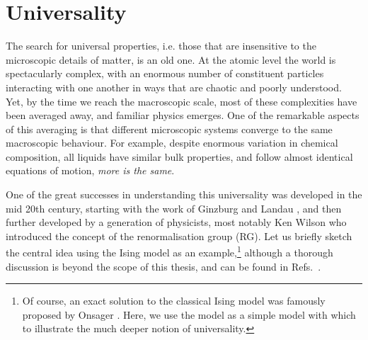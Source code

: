 \section{Universality} \label{sec:universality}

The search for universal properties, i.e. those that are insensitive to the microscopic details of matter, is an old one. At the atomic level the world is spectacularly complex, with an enormous number of constituent particles interacting with one another in ways that are chaotic and poorly understood. Yet, by the time we reach the macroscopic scale, most of these complexities have been averaged away, and familiar physics emerges. One of the remarkable aspects of this averaging is that different microscopic systems converge to the same macroscopic behaviour. For example, despite enormous variation in chemical composition, all liquids have similar bulk properties, and follow almost identical equations of motion, \textit{more is the same}.%

One of the great successes in understanding this universality was developed in the mid 20th century, starting with the work of Ginzburg and Landau \cite{ginzburg_theory_1950}, and then further developed by a generation of physicists, most notably Ken Wilson \cite{wilson_renormalization_1975} who introduced the concept of the renormalisation group (RG). Let us briefly sketch the central idea using the Ising model as an example,\footnote{Of course, an exact solution to the classical Ising model was famously proposed by Onsager \cite{onsager_crystal_1944}. Here, we use the model as a simple model with which to illustrate the much deeper notion of universality.} although a thorough discussion is beyond the scope of this thesis, and can be found in Refs.~\cite{cardy_scaling_1996,chaikin_principles_1995}. 

